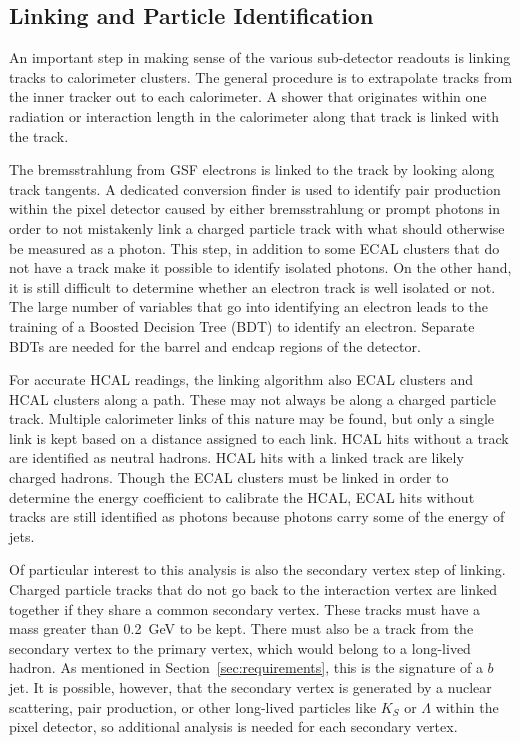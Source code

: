 \subsection{Linking and Particle Identification}

An important step in making sense of the various sub-detector readouts is linking
tracks to calorimeter clusters.
The general procedure is to extrapolate tracks from the inner tracker
out to each calorimeter.
A shower that originates within one radiation or interaction length in the calorimeter
along that track is linked with the track.

The bremsstrahlung from GSF electrons is linked to the track by looking along track tangents.
A dedicated conversion finder is used to identify pair production within the pixel detector
caused by either bremsstrahlung or prompt photons in order to not mistakenly link
a charged particle track with what should otherwise be measured as a photon.
This step, in addition to some ECAL clusters that do not have a track
make it possible to identify isolated photons.
On the other hand, it is still difficult to determine
whether an electron track is well isolated or not.
The large number of variables that go into identifying an electron
leads to the training of a Boosted Decision Tree (BDT) to identify an electron.
Separate BDTs are needed for the barrel and endcap regions of the detector.

For accurate HCAL readings,
the linking algorithm also ECAL clusters and HCAL clusters along a path.
These may not always be along a charged particle track.
Multiple calorimeter links of this nature may be found,
but only a single link is kept based on a distance assigned to each link.
HCAL hits without a track are identified as neutral hadrons.
HCAL hits with a linked track are likely charged hadrons.
Though the ECAL clusters must be linked in order to determine the energy
coefficient to calibrate the HCAL,
ECAL hits without tracks are still identified as photons because photons
carry some of the energy of jets.

Of particular interest to this analysis is also the secondary vertex step of linking.
Charged particle tracks that do not go back to the interaction vertex
are linked together if they share a common secondary vertex.
These tracks must have a mass greater than \SI{0.2}{GeV} to be kept.
There must also be a track from the secondary vertex to the primary vertex,
which would belong to a long-lived hadron.
As mentioned in Section~\ref{sec:requirements}, this is the signature of a $b$ jet.
It is possible, however, that the secondary vertex is generated
by a nuclear scattering, pair production, or other long-lived particles
like $K_S$ or $\Lambda$ within the pixel detector,
so additional analysis is needed for each secondary vertex.

